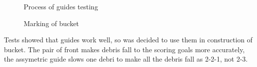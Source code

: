 \begin{enumerate}
\begin{figure}[h]
\begin{minipage}[h]{0.31\linewidth}
  		\caption{Process of guides testing}
  	\end{minipage}
  	\hfill
  	\begin{minipage}[h]{0.31\linewidth}
  		\caption{Marking of bucket}
  	\end{minipage}
  \end{figure}
  Tests showed that guides work well, so was decided to use them in construction of bucket. The pair of front makes debris fall to the scoring goals more accurately, the assymetric guide slows one debri to make all the debris fall as 2-2-1, not 2-3.
 

\end{enumerate}
